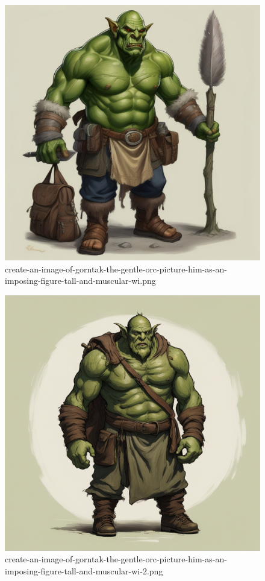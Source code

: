 \begin{figure}
\centering
\includegraphics{create-an-image-of-gorntak-the-gentle-orc-picture-him-as-an-imposing-figure-tall-and-muscular-wi.png}
\caption{create-an-image-of-gorntak-the-gentle-orc-picture-him-as-an-imposing-figure-tall-and-muscular-wi.png}
\end{figure}

\begin{figure}
\centering
\includegraphics{create-an-image-of-gorntak-the-gentle-orc-picture-him-as-an-imposing-figure-tall-and-muscular-wi-2.png}
\caption{create-an-image-of-gorntak-the-gentle-orc-picture-him-as-an-imposing-figure-tall-and-muscular-wi-2.png}
\end{figure}

